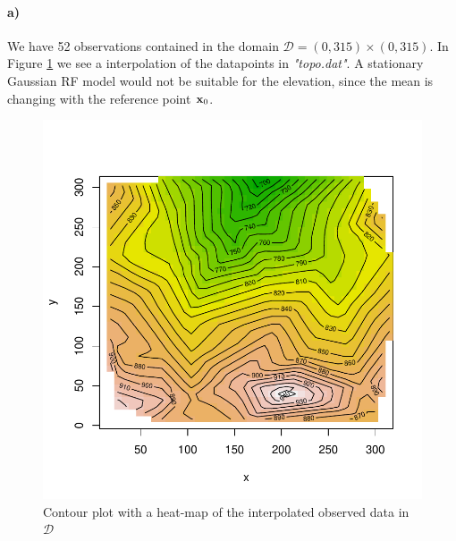 \paragraph{a)}
We have 52 observations contained in the domain $\mathcal{D} = (0,315)\times(0,315)$. In Figure \ref{fig:terrain2a} we see a interpolation of the datapoints in \textit{"topo.dat"}. A stationary Gaussian RF model would not be suitable for the elevation, since the mean is changing with the reference point $\boldsymbol{\mathbf{x}}_0$.

\begin{figure}[htb]
    \centering
    \includegraphics{figures/terrain2a.pdf}
    \caption{Contour plot with a heat-map of the interpolated observed data in $\mathcal{D}$}
    \label{fig:terrain2a}
\end{figure}


